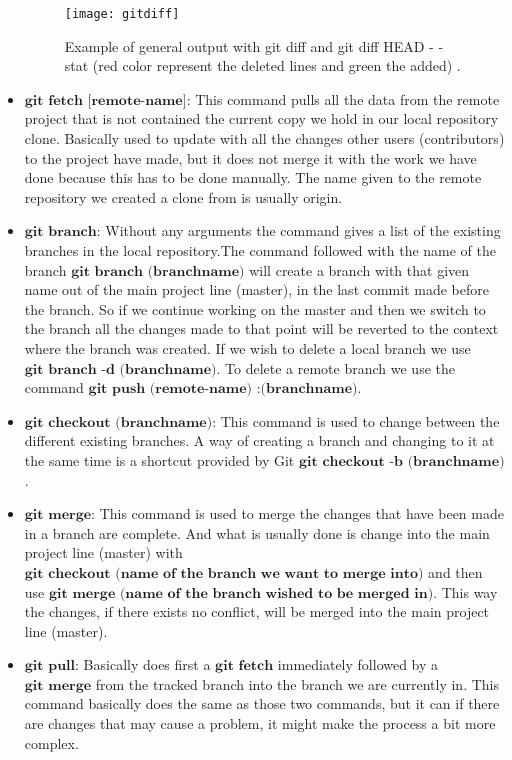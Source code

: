 \begin{itemize}
\begin{figure}[H]
\begin{center}
	\texttt{[image: gitdiff]}

\caption{ Example of general output with git diff and git diff  HEAD - - stat (red color represent the deleted lines and green the added) .}
\label{fig:imggitdiff}
\end{center}
\end{figure}

	\item $\textbf{git fetch [remote-name]:}$ This command pulls all the data from the remote project that is not contained the current copy we hold in our local repository clone. Basically used to update with all the changes other users (contributors) to the project have made, but it does not merge it with the work we have done because this has to be done manually. The name given to the remote repository we created a clone from is usually origin.
	\item $\textbf{git branch:}$  Without any arguments the command gives a list of the existing branches in the local repository.The command followed with the name of the branch $\textbf{git branch (branchname)}$ will create a branch with that given name out of the main project line (master), in the last commit made before the branch. So if we continue working on the master and then we switch to the branch all the changes made to that point will be reverted to the context where the branch was created.  If we wish to delete a local branch we use $\textbf{git branch -d (branchname)}$. To delete a remote branch we use the command $\textbf{git push (remote-name) :(branchname)}$.
	\item $\textbf{git checkout (branchname):}$ This command is used to change between the different existing branches. A way of creating a branch and changing to it at the same time is a shortcut provided by Git $\textbf{git checkout -b (branchname)}$. 
	\item $\textbf{git merge:}$ This command is used to merge the changes that have been made in a branch are complete. And what is usually done is change into the main project line (master) with $\textbf{git checkout (name of the branch we want to merge into)}$ and then use $\textbf{git merge (name of the branch wished to be merged in)}$. This way the changes, if there exists no conflict, will be merged into the main project line (master).
	\item $\textbf{git pull:}$ Basically does first a $\textbf{git fetch}$ immediately followed by a $\textbf{git merge}$ from the tracked branch into the branch we are currently in. This command basically does the same as those two commands, but it can if there are changes that may cause a problem, it might make the process a bit more complex. 


\end{itemize}
